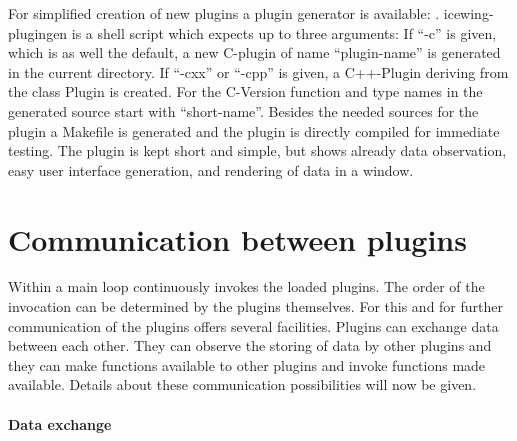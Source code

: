 For simplified creation of new plugins a plugin generator is
available: \mbox{\emph{}}.
icewing-plugingen is a shell script which expects up to three
arguments:
\sS
{}
\sE
If ``-c'' is given, which is as well the default, a new C-plugin of
name ``plugin-name'' is generated in the current directory. If
``-cxx'' or ``-cpp'' is given, a C++-Plugin deriving from the class
Plugin is created. For the C-Version function and type names in the
generated source start with ``short-name''. Besides the needed
sources for the plugin a Makefile is generated and the plugin is
directly compiled for immediate testing. The plugin is kept short
and simple, but shows already data observation, easy user interface
generation, and rendering of data in a window.

\section{Communication between plugins}
\label{sec:p_kommunikation}

Within a main loop \icewing{} continuously invokes the loaded
plugins. The order of the invocation can be determined by the
plugins themselves. For this and for further communication of the
plugins \icewing{} offers several facilities. Plugins can exchange
data between each other. They can observe the storing of data by
other plugins and they can make functions available to other plugins
and invoke functions made available. Details about these
communication possibilities will now be given.

\paragraph{Data exchange}\hfill\\

